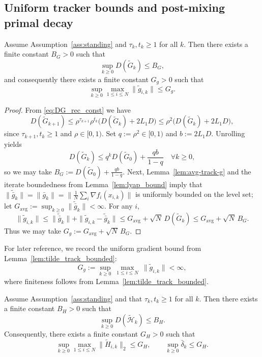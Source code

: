\documentclass[review,onefignum,onetabnum]{siamart171218}
\begin{document}
	\subsection{Uniform tracker bounds and post-mixing primal decay}
	
	\begin{lemma}\label{lem:tilde_track_bounded}
		Assume Assumption~\ref{ass:standing} and $\tau_k,t_k\ge 1$ for all $k$.
		Then there exists a finite constant $B_G>0$ such that
		\[
		\sup_{k\ge 0} D(\tilde G_k)\le B_G,
		\]
		and consequently there exists a finite constant $G_g>0$ such that
		\[
		\sup_{k\ge 0}\max_{1\le i\le N}\|\tilde g_{i,k}\|\le G_g.
		\]
	\end{lemma}
	\begin{proof}
		From \eqref{eq:DG_rec_const} we have
		\[
		D(\tilde G_{k+1})\le \rho^{\tau_{k+1}}\rho^{t_k}\big(D(\tilde G_k)+2L_1D\big)\le \rho^2\big(D(\tilde G_k)+2L_1D\big),
		\]
		since $\tau_{k+1},t_k\ge 1$ and $\rho\in[0,1)$.
		Set $q:=\rho^2\in[0,1)$ and $b:=2L_1D$. Unrolling yields
		\[
		D(\tilde G_k)\le q^k D(\tilde G_0)+\frac{qb}{1-q}\quad\forall k\ge 0,
		\]
		so we may take $B_G:=D(\tilde G_0)+\frac{qb}{1-q}$.
		Next, Lemma~\ref{lem:avg-track-g} and the iterate boundedness from Lemma~\ref{lem:lyap_bound} imply that
		$\|\tilde{\bar g}_k\|=\|\bar g_k\|=\big\|\frac1N\sum_i \nabla f_i(x_{i,k})\big\|$ is uniformly bounded on the level set;
		let $G_{\mathrm{avg}}:=\sup_{k\ge 0}\|\tilde{\bar g}_k\|<\infty$.
		For any $i$,
		\[
		\|\tilde g_{i,k}\|\le \|\tilde{\bar g}_k\|+\|\tilde g_{i,k}-\tilde{\bar g}_k\|
		\le G_{\mathrm{avg}}+\sqrt N\,D(\tilde G_k)\le G_{\mathrm{avg}}+\sqrt N\,B_G.
		\]
		Thus we may take $G_g:=G_{\mathrm{avg}}+\sqrt N\,B_G$.
	\end{proof}
	
	For later reference, we record the uniform gradient bound from Lemma~\ref{lem:tilde_track_bounded}:
	\begin{equation}\label{eq:step_unif_app}
		G_g:=\sup_{k\ge 0}\ \max_{1\le i\le N}\ \|\tilde g_{i,k}\| < \infty,
	\end{equation}
	where finiteness follows from Lemma~\ref{lem:tilde_track_bounded}.
	
	\begin{lemma}\label{lem:tilde_hess_bounded}
		Assume Assumption~\ref{ass:standing} and that $\tau_k,t_k\ge 1$ for all $k$.
		Then there exists a finite constant $B_H>0$ such that
		\[
		\sup_{k\ge 0} D(\tilde{\mathcal H}_k)\le B_H.
		\]
		Consequently, there exists a finite constant $G_H>0$ such that
		\[
		\sup_{k\ge 0}\max_{1\le i\le N}\big\|\tilde H_{i,k}\big\|_2 \le G_H,
		\qquad
		\sup_{k\ge 0}\bar\delta_k \le G_H.
		\]
	\end{lemma}
	
\end{document}
